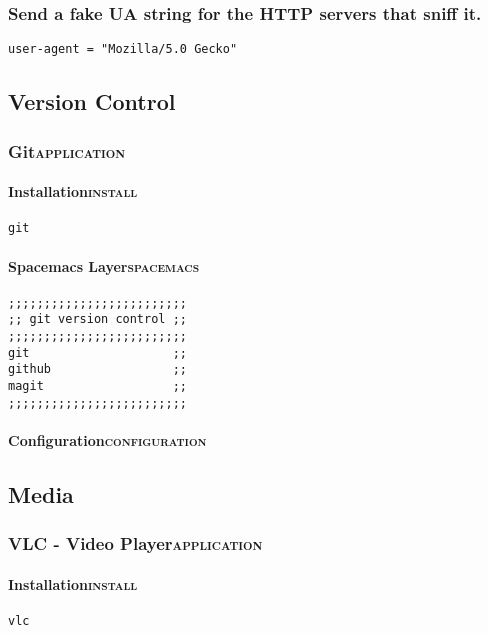 \documentclass[11pt]{article}
\begin{document}
\subsubsection{Send a fake UA string for the HTTP servers that sniff it.}
\label{sec:org96d052c}
\begin{verbatim}
user-agent = "Mozilla/5.0 Gecko"
\end{verbatim}

\subsection{Version Control}
\label{sec:org474b466}
\subsubsection{Git\hfill{}\textsc{application}}
\label{sec:orgcc67935}
\paragraph{Installation\hfill{}\textsc{install}}
\label{sec:orgbce2ecd}
\begin{verbatim}
git
\end{verbatim}

\paragraph{Spacemacs Layer\hfill{}\textsc{spacemacs}}
\label{sec:org6ca7da9}
\begin{verbatim}
;;;;;;;;;;;;;;;;;;;;;;;;;
;; git version control ;;
;;;;;;;;;;;;;;;;;;;;;;;;;
git                    ;;
github                 ;;
magit                  ;;
;;;;;;;;;;;;;;;;;;;;;;;;;
\end{verbatim}

\paragraph{Configuration\hfill{}\textsc{configuration}}
\label{sec:org0642c64}
\subsection{Media}
\label{sec:org87fdd95}
\subsubsection{VLC - Video Player\hfill{}\textsc{application}}
\label{sec:orgc74f766}
\paragraph{Installation\hfill{}\textsc{install}}
\label{sec:orge3108ab}
\begin{verbatim}
vlc
\end{verbatim}
\end{document}
